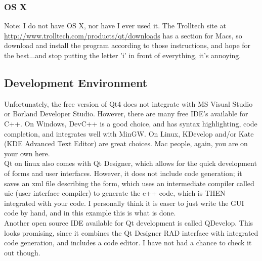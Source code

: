 \subsubsection{OS X}
Note: I do not have OS X, nor have I ever used it. The Trolltech site at \url{http://www.trolltech.com/products/qt/downloads} has a section for Macs, so download and install the program according to those instructions, and hope for the best...and stop putting the letter 'i' in front of everything, it's annoying.

\subsection{Development Environment}
Unfortunately, the free version of Qt4 does not integrate with MS Visual Studio or Borland Developer Studio. However, there are many free IDE's available for C++. On Windows, DevC++ is a good choice, and has syntax highlighting, code completion, and integrates well with MinGW. On Linux, KDevelop and/or Kate (KDE Advanced Text Editor) are great choices. Mac people, again, you are on your own here.\\
Qt on linux also comes with Qt Designer, which allows for the quick development of forms and user interfaces. However, it does not include code generation; it saves an xml file describing the form, which uses an intermediate compiler called uic (user interface compiler) to generate the c++ code, which is THEN integrated with your code. I personally think it is easer to just write the GUI code by hand, and in this example this is what is done.\\
Another open source IDE available for Qt development is called QDevelop. This looks promising, since it combines the Qt Designer RAD interface with integrated code generation, and includes a code editor. I have not had a chance to check it out though.
